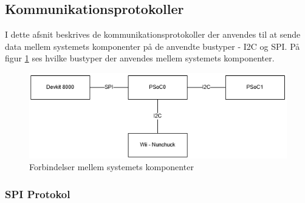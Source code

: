 \subsection{Kommunikationsprotokoller}
\label{afsnit:kommunikationsprotokoller}
I dette afsnit beskrives de kommunikationsprotokoller der anvendes til at sende data mellem systemets komponenter på de anvendte bustyper - I2C og SPI. På figur \ref{fig:kommunikationsOverblik} ses hvilke bustyper der anvendes mellem systemets komponenter. 

\begin{figure}[H]
	\centering
	\includegraphics[width=\textwidth] {Systemarkitektur/images/anvendtebustyper}
	\caption{Forbindelser mellem systemets komponenter}
	\label{fig:kommunikationsOverblik}
\end{figure}

\subsubsection{SPI Protokol}

